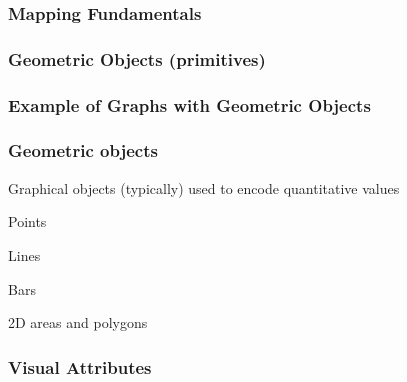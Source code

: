 \documentclass[12pt]{beamer}\usepackage[]{graphicx}\usepackage[]{color}
\begin{document}

\begin{frame}
\begin{center}
\Huge{}
\end{center}
\end{frame}


\begin{frame}
\frametitle{Mapping Fundamentals}
\begin{center}
\end{center}
\end{frame}


\begin{frame}
\frametitle{Geometric Objects (primitives)}
\begin{center}
\end{center}
\end{frame}


\begin{frame}
\frametitle{Example of Graphs with Geometric Objects}
\begin{center}
\end{center}
\end{frame}


\begin{frame}
\frametitle{ Geometric objects}

Graphical objects (typically) used to encode quantitative values

\bbi
  \item Points
  \item Lines
  \item Bars
  \item 2D areas and polygons
\ei

\end{frame}


\begin{frame}
\frametitle{Visual Attributes}
\begin{center}
\end{center}
\end{frame}
\end{document}
